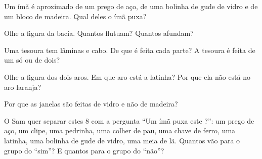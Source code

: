 \begin{exercise}[$\star$]\label{exo:g1:materials-around-us:6}
Um ímã é aproximado de um prego de aço, de uma bolinha de gude de vidro
e de um bloco de madeira. Qual deles o ímã puxa?
\end{exercise}

\begin{exercise}[$\star$]\label{exo:g1:materials-around-us:7}
Olhe a figura da bacia. Quantos  flutuam? Quantos afundam?
\end{exercise}

\begin{exercise}[$\star$]\label{exo:g1:materials-around-us:8}
Uma tesoura tem lâminas e cabo. De que  é feita cada parte?
A tesoura é feita de um  só ou de dois?
\end{exercise}

\begin{exercise}[$\star$]\label{exo:g1:materials-around-us:9}
Olhe a figura dos dois aros. Em que aro está a latinha? Por que ela não
está no aro laranja?
\end{exercise}

\begin{exercise}[$\star\star$]\label{exo:g1:materials-around-us:10}
Por que as janelas são feitas de vidro e não de madeira?
\end{exercise}

\begin{exercise}[$\star\star$]\label{exo:g1:materials-around-us:11}
O Sam quer separar estes 8  com a pergunta ``Um ímã puxa este
?'': um prego de aço, um clipe, uma pedrinha, uma colher de pau,
uma chave de ferro, uma latinha, uma bolinha de gude de vidro, uma meia
de lã. Quantos  vão para o grupo do ``sim''? E quantos para o
grupo do ``não''?
\end{exercise}